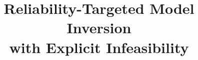 \documentclass[conference,letterpaper]{IEEEtran}
\begin{document}
\title{Reliability-Targeted Model Inversion\\with Explicit Infeasibility}

\newif\ifanon
\anontrue                        %

\ifanon
  \author{
  }
\else
  \IfFileExists{authors.local.tex}{}{%
    \PackageError{aaiml2027}{authors.local.tex is missing}{%
      Camera-ready needs paper/authors.local.tex (gitignored, so it is not in
      a fresh clone). Recreate it with the \string\author{} block, or set
      \string\anontrue to build the anonymous version.}}
\fi

\maketitle
\end{document}
